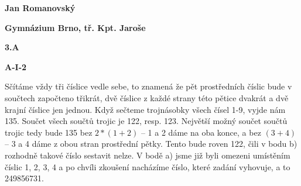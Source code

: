 \documentclass{article}
\title{\vspace{-2cm}\vspace{-1.7cm}}
\date{}
\author{}
\begin{document}
\maketitle
\noindent \textbf{Jan Romanovský}

\noindent \textbf{Gymnázium Brno, tř. Kpt. Jaroše}

\noindent \textbf{3.A}

\noindent \textbf{A-\textrm{I}-2}

\textbf{ }

Sčítáme vždy tři číslice vedle sebe, to znamená že pět prostředních číslic bude v součtech započteno třikrát, dvě číslice z každé strany této pětice dvakrát a dvě krajní číslice jen jednou. Když sečteme trojnásobky všech čísel 1-9, vyjde nám 135. Součet všech součtů trojic je 122, resp. 123. Největší možný součet součtů trojic tedy bude 135 bez $2*(1+2)$ -- 1 a 2 dáme na oba konce, a bez $(3+4)$ -- 3 a 4 dáme z obou stran prostřední pětky. Tento bude roven 122, čili v bodu b) rozhodně takové číslo sestavit nelze. V bodě a) jsme již byli omezeni umístěním číslic 1, 2, 3, 4 a po chvíli zkoušení nacházíme číslo, které zadání vyhovuje, a to 249856731.
\end{document}
